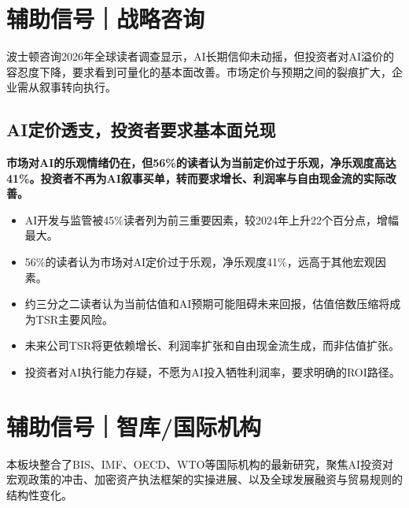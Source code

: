 \documentclass[11pt]{ctexart}
\begin{document}
\section{辅助信号｜战略咨询}
波士顿咨询2026年全球读者调查显示，AI长期信仰未动摇，但投资者对AI溢价的容忍度下降，要求看到可量化的基本面改善。市场定价与预期之间的裂痕扩大，企业需从叙事转向执行。
\subsection{AI定价透支，投资者要求基本面兑现}
\textbf{市场对AI的乐观情绪仍在，但56\%的读者认为当前定价过于乐观，净乐观度高达41\%。投资者不再为AI叙事买单，转而要求增长、利润率与自由现金流的实际改善。}
\begin{itemize}
  \item AI开发与监管被45\%读者列为前三重要因素，较2024年上升22个百分点，增幅最大。
  \item 56\%的读者认为市场对AI定价过于乐观，净乐观度41\%，远高于其他宏观因素。
  \item 约三分之二读者认为当前估值和AI预期可能阻碍未来回报，估值倍数压缩将成为TSR主要风险。
  \item 未来公司TSR将更依赖增长、利润率扩张和自由现金流生成，而非估值扩张。
  \item 投资者对AI执行能力存疑，不愿为AI投入牺牲利润率，要求明确的ROI路径。
\end{itemize}
\newpage
\section{辅助信号｜智库/国际机构}
本板块整合了BIS、IMF、OECD、WTO等国际机构的最新研究，聚焦AI投资对宏观政策的冲击、加密资产执法框架的实操进展、以及全球发展融资与贸易规则的结构性变化。
\end{document}
